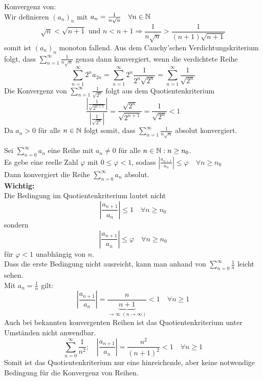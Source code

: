 \documentclass[../ana1u.tex]{subfiles}
\begin{document}
\begin{bsp}
    Konvergenz von:\\
    Wir definieren \((a_n)_n\) mit \(a_n = \frac{1}{n\sqrt{n}} \quad \forall n \in \mathbb{N}\)\\
    \[\sqrt{n} < \sqrt{n+1} \text{ und } n < n+1 \Rightarrow \frac{1}{n\sqrt{n}} > \frac{1}{(n+1)\sqrt{n+1}}\]
    somit ist \((a_n)_n\) monoton fallend. Aus dem Cauchy'schen Verdichtungskriterium folgt, dass \(\sum_{n=1}^{\infty} \frac{1}{n\sqrt{n}}\) genau dann konvergiert, wenn die verdichtete Reihe
    \[\sum_{n=1}^{\infty} 2^n a_{2n} = \sum_{n=1}^{\infty} 2^n \frac{1}{2^n\sqrt{2^n}} = \sum_{n=1}^{\infty} \frac{1}{\sqrt{2^n}}\]
    Die Konvergenz von \(\sum_{n=1}^{\infty} \frac{1}{\sqrt{2^n}}\) folgt aus dem Quotientenkriterium
    \[\frac{\left|\frac{1}{\sqrt{2^{n+1}}}\right|}{\left|\frac{1}{\sqrt{2^n}}\right|} = \frac{\sqrt{2^n}}{\sqrt{2^{n+1}}} = \frac{1}{\sqrt{2^n}} < 1\]
    Da \(a_n > 0\) für alle \(n \in \mathbb{N}\) folgt somit, dass \(\sum_{n=1}^{\infty} \frac{1}{n\sqrt{n}}\) absolut konvergiert.
\end{bsp}
\begin{satz}[Quotientenkriterium]
    Sei \(\sum_{n=0}^{\infty} a_n\) eine Reihe mit \(a_n \neq 0\) für alle \(n \in \mathbb{N}: n \geq n_0\).\\
    Es gebe eine reelle Zahl \(\varphi\) mit \(0 \leq \varphi < 1\), sodass \(\left|\frac{a_{n+1}}{a_n}\right| \leq \varphi \quad \forall n \geq n_0\)\\
    Dann konvergiert die Reihe \(\sum_{n=0}^{\infty} a_n\) absolut.\\
    \textbf{Wichtig:}\\
    Die Bedingung im Quotientenkriterium lautet nicht 
    \[\left|\frac{a_{n+1}}{a_n}\right| \leq 1 \quad \forall n \geq n_0\]
    sondern
    \[\left|\frac{a_{n+1}}{a_n}\right| \leq \varphi \quad \forall n \geq n_0\]
    für \(\varphi < 1\) unabhängig von \(n\).\\
    Dass die erste Bedingung nicht ausreicht, kann man anhand von \(\sum_{n=0}^{\infty} \frac{1}{n}\) leicht sehen.\\
    Mit \(a_n = \frac{1}{n}\) gilt: 
    \[\left|\frac{a_{n+1}}{a_n}\right| = \frac{n}{\underbrace{n+1}_{\rightarrow \infty \; (n \rightarrow \infty)}} < 1 \quad \forall n \geq 1\]
    Auch bei bekannten konvergenten Reihen ist das Quotientenkriterium unter Umständen nicht anwendbar.
    \[\sum_{n=0}^{\infty} \frac{1}{n^2}; \quad \left|\frac{a_{n+1}}{a_n}\right| = \frac{n^2}{(n+1)^2} < 1 \quad \forall n \geq 1\]
    Somit ist das Quotientenkriterium nur eine hinreichende, aber keine notwendige Bedingung für die Konvergenz von Reihen.
\end{satz}
\end{document}
